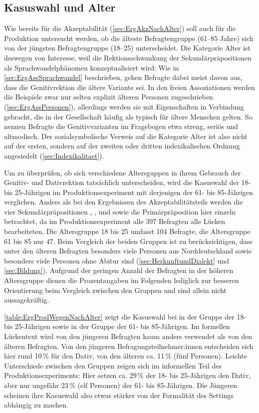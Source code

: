 \subsection{Kasuswahl und Alter}
\label{sec:ErgProdNachAlter}
Wie bereits für die Akzeptabilität (\autoref{sec:ErgAkzNachAlter}) soll auch für die Produktion untersucht werden, ob die älteste Befragtengruppe (61--85 Jahre) sich von der jüngsten Befragtengruppe (18--25) unterscheidet. 
Die Kategorie \glqq Alter\grqq{} ist deswegen von Interesse, weil die Rektionsschwankung der Sekundärpräpositionen als Sprachwandelphänomen konzeptualisiert wird: 
Wie in \autoref{sec:ErgAssSprachwandel} beschrieben, gehen Befragte dabei meist davon aus, dass die Genitivrektion die ältere Variante sei.
In den freien Assoziationen werden die Beispiele zwar nur selten explizit älteren Personen zugeschrieben (\autoref{sec:ErgAssPersonen}), allerdings werden sie mit Eigenschaften in Verbindung gebracht, die in der Gesellschaft häufig als typisch für ältere Menschen gelten. 
So nennen Befragte die Genitivvarianten im Fragebogen etwa streng, seriös und altmodisch.  
Der sozialsymbolische Verweis auf die Kategorie \glqq Alter\grqq{} ist also nicht auf der ersten, sondern auf der zweiten oder dritten indexikalischen Ordnung angesiedelt (\autoref{sec:Indexikalitaet}). 

Um zu überprüfen, ob sich verschiedene Altersguppen in ihrem Gebrauch der Genitiv- und Dativrektion tatsächlich unterscheiden, wird die Kasuswahl der 18- bis 25-Jährigen im Produktionsexperiment mit derjenigen der 61- bis 85-Jährigen verglichen. 
Anders als bei den Ergebnissen des Akzeptabilitätsteils werden die vier Sekundärpräpositionen \wegen, \waehrend, \dank{} und \gegenueber{} sowie die Primärpräposition  hier einzeln betrachtet, da im Produktionsexperiment alle 397 Befragten alle Lücken bearbeiteten. 
Die Altersgruppe 18 bis 25 umfasst 104 Befragte, die Altersgruppe 61 bis 85 nur 47. 
Beim Vergleich der beiden Gruppen ist zu berücksichtigen, dass unter den älteren Befragten besonders viele Personen aus Norddeutschland sowie besonders viele Personen ohne Abitur sind (\autoref{sec:HerkunftundDialekt} und \autoref{sec:Bildung}). 
Aufgrund der geringen Anzahl der Befragten in der höheren Altersgruppe dienen die Prozentangaben im Folgenden lediglich zur besseren Orientierung beim Vergleich zwischen den Gruppen und sind allein nicht aussagekräftig. 

\autoref{table:ErgProdWegenNachAlter} zeigt die Kasuswahl bei \wegen{} in der Gruppe der 18- bis 25\hyp Jährigen sowie in der Gruppe der 61- bis 85-Jährigen.
Im formellen Lückentext wird \wegen{} von den jüngeren Befragten kaum anders verwendet als von den älteren Befragten. 
Von den jüngeren Befragungsteilnehmer:innen entscheiden sich hier rund 10\,\% für den Dativ, von den älteren ca. 11\,\% (fünf Personen). 
Leichte Unterschiede zwischen den Gruppen zeigen sich im informellen Teil des Produktionsexperiments:
Hier setzen ca. 29\,\% der 18- bis 25-Jährigen den Dativ, aber nur ungefähr 23\,\% (elf Personen) der 61- bis 85-Jährigen. 
Die Jüngeren scheinen ihre Kasuswahl also etwas stärker von der Formalität des Settings abhängig zu machen. 

